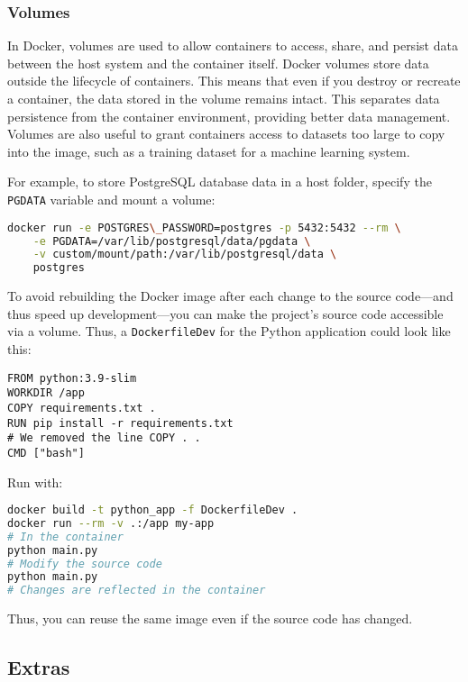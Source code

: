 \documentclass[french]{article}
\begin{document}
\subsubsection{Volumes}

In Docker, volumes are used to allow containers to access, share, and persist data between the host system and the container itself.
Docker volumes store data outside the lifecycle of containers.
This means that even if you destroy or recreate a container, the data stored in the volume remains intact.
This separates data persistence from the container environment, providing better data management.
Volumes are also useful to grant containers access to datasets too large to copy into the image, such as a training dataset for a machine learning system.

For example, to store PostgreSQL database data in a host folder, specify the \texttt{PGDATA} variable and mount a volume:

\begin{lstlisting}[language=bash]
docker run -e POSTGRES\_PASSWORD=postgres -p 5432:5432 --rm \
    -e PGDATA=/var/lib/postgresql/data/pgdata \
    -v custom/mount/path:/var/lib/postgresql/data \
    postgres
\end{lstlisting}

To avoid rebuilding the Docker image after each change to the source code—and thus speed up development—you can make the project’s source code accessible via a volume.
Thus, a \texttt{DockerfileDev} for the Python application could look like this:

\begin{lstlisting}
FROM python:3.9-slim
WORKDIR /app
COPY requirements.txt .
RUN pip install -r requirements.txt
# We removed the line COPY . .
CMD ["bash"]
\end{lstlisting}

Run with:
\begin{lstlisting}[language=bash]
docker build -t python_app -f DockerfileDev . 
docker run --rm -v .:/app my-app
# In the container
python main.py
# Modify the source code
python main.py
# Changes are reflected in the container
\end{lstlisting}

Thus, you can reuse the same image even if the source code has changed.

\subsection{Extras}
\end{document}
